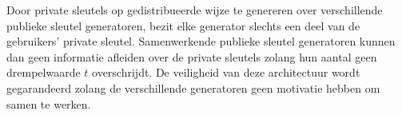 Door private sleutels op gedistribueerde wijze te genereren over verschillende publieke sleutel generatoren, bezit elke generator slechts een deel van de gebruikers' private sleutel. Samenwerkende publieke sleutel generatoren kunnen dan geen informatie afleiden over de private sleutels zolang hun aantal geen drempelwaarde $t$ overschrijdt. De veiligheid van deze architectuur wordt gegarandeerd zolang de verschillende generatoren geen motivatie hebben om samen te werken.

\begin{figure}[ht]
    \begin{center}
\end{center}
\end{figure}
